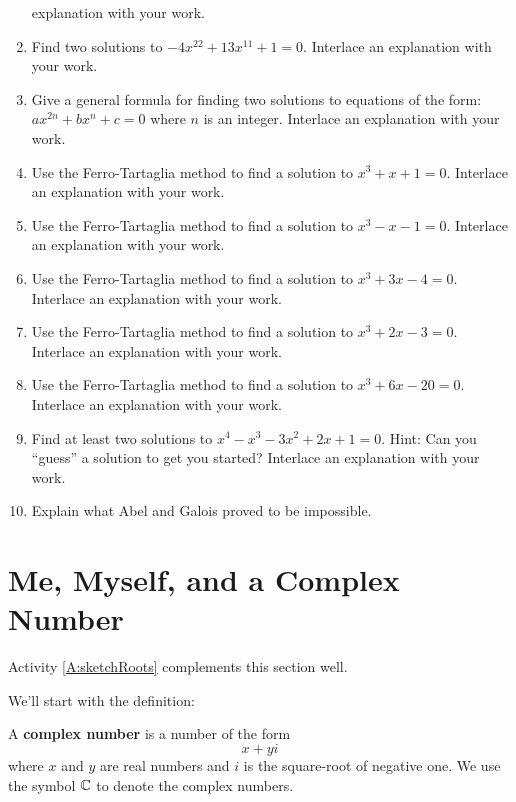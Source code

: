 \begin{problems}
\begin{enumerate}
  explanation with your work.
\item Find two solutions to $-4x^{22} + 13x^{11} + 1 = 0$. Interlace
  an explanation with your work.
\item Give a general formula for finding two solutions to equations of
  the form: $ax^{2n} + bx^{n} + c = 0$ where $n$ is an
  integer. Interlace an explanation with your work.
\item Use the Ferro-Tartaglia method to find a solution to $x^3+x+1 =
  0$. Interlace an explanation with your work.
\item Use the Ferro-Tartaglia method to find a solution to $x^3-x-1 =
  0$. Interlace an explanation with your work.
\item Use the Ferro-Tartaglia method to find a solution to $x^3+3x-4 =
  0$. Interlace an explanation with your work.
\item Use the Ferro-Tartaglia method to find a solution to $x^3+2x-3 =
  0$. Interlace an explanation with your work.
\item Use the Ferro-Tartaglia method to find a solution to $x^3+6x-20 =
  0$. Interlace an explanation with your work.
\item Find at least two solutions to $x^4-x^3-3x^2+2x+1 =0$. Hint: Can
  you ``guess'' a solution to get you started?  Interlace an
  explanation with your work.
\item Explain what Abel and Galois proved to be impossible.
\end{enumerate}
\end{problems}





\section{Me, Myself, and a Complex Number}

\begin{activitynote}
Activity \ref{A:sketchRoots} complements this section well.  %
\end{activitynote}


We'll start with the definition:

\begin{definition} 
A \textbf{complex number} is a
number of the form
\[
x + yi
\]
where $x$ and $y$ are real numbers and $i$ is the square-root of
negative one. We use the symbol $\mathbb C$ to denote the complex numbers.
\end{definition}

